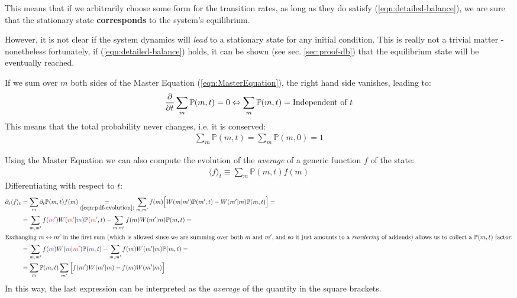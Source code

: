 \documentclass[../../main.tex]{subfiles}
\begin{document}
This means that if we arbitrarily choose some form for the transition rates, as long as they do satisfy (\ref{eqn:detailed-balance}), we are sure that the stationary state \textbf{corresponds} to the system's equilibrium.

\medskip

However, it is not clear if the system dynamics will \textit{lead} to a stationary state for any initial condition. This is really not a trivial matter - nonetheless fortunately, if (\ref{eqn:detailed-balance}) holds, it can be shown (see sec. \ref{sec:proof-db}) that the equilibrium state will be eventually reached. 

\medskip

If we sum over $m$ both sides of the Master Equation (\ref{eqn:MasterEquation}), the right hand side vanishes, leading to:
\begin{align*}
    \pdv{t} \sum_m \mathbb{P}(m,t) = 0 \Leftrightarrow \sum_{m} \mathbb{P}(m,t) = \text{Independent of $t$}
\end{align*}
This means that the total probability never changes, i.e. it is conserved:
\begin{align}\label{eqn:conservation-of-probability}
    \sum_{m} \mathbb{P}(m,t) = \sum_{m} \mathbb{P}(m,0) = 1
\end{align}

Using the Master Equation we can also compute the evolution of the \textit{average} of a generic function $f$ of the state:
\begin{align*}
    \langle f \rangle_t \equiv \sum_m \mathbb{P}(m,t) f(m)
\end{align*}
Differentiating with respect to $t$:
\begin{align} \nonumber
    \partial_t \langle f \rangle_t &= \sum_m \partial_t \mathbb{P}(m,t) f(m) \underset{(\ref{eqn:pdf-evolution})}{=}  \sum_{m,m'} f(m) \Big[ W(m|m')\mathbb{P}(m',t) - W(m'|m)\mathbb{P}(m,t)\Big] =\\ \nonumber
    &= \sum_{m,m'} f(\textcolor{Red}{m'}) W(\textcolor{Red}{m'}|\textcolor{Blue}{m}) \mathbb{P}(\textcolor{Red}{m'},t) - \sum_{m, m'} f(m) W(m'|m)\mathbb{P}(m,t) = \\ 
    \shortintertext{Exchanging $m \leftrightarrow m'$ in the first sum (which is allowed since we are summing over both $m$ and $m'$, and so it just amounts to a \textit{reordering} of addends) allows us to collect a $\mathbb{P}(m,t)$ factor:} \nonumber
    &= \sum_{m,m'} f(\textcolor{Blue}{m}) W(\textcolor{Blue}{m}|\textcolor{Red}{m'}) \mathbb{P}(\textcolor{Blue}{m},t) - \sum_{m,m'} f(m) W(m'|m) \mathbb{P}(m,t) =\\ \label{eqn:evolution-of-averages}
    &= \sum_m \mathbb{P}(m,t) \sum_{m'} \Big[f(m') W(m'|m) - f(m) W(m'|m) \Big]
\end{align}
In this way, the last expression can be interpreted as the \textit{average} of the quantity in the square brackets. 
\end{document}
